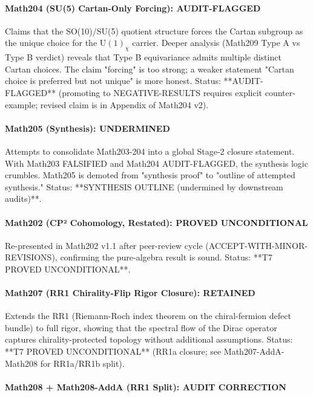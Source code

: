 \paragraph{Math204 (SU(5) Cartan-Only Forcing): AUDIT-FLAGGED}

Claims that the SO(10)/SU(5) quotient structure forces the Cartan subgroup as
the unique choice for the $\mathrm{U}(1)_\chi$ carrier. Deeper analysis (Math209 Type A vs Type B
verdict) reveals that Type B equivariance admits multiple distinct Cartan choices.
The claim "forcing" is too strong; a weaker statement "Cartan choice is preferred
but not unique" is more honest. Status: **AUDIT-FLAGGED** (promoting to NEGATIVE-RESULTS
requires explicit counter-example; revised claim is in Appendix of Math204 v2).

\paragraph{Math205 (Synthesis): UNDERMINED}

Attempts to consolidate Math203-204 into a global Stage-2 closure statement. With
Math203 FALSIFIED and Math204 AUDIT-FLAGGED, the synthesis logic crumbles.
Math205 is demoted from "synthesis proof" to "outline of attempted synthesis."
Status: **SYNTHESIS OUTLINE (undermined by downstream audits)**.

\paragraph{Math202 (CP² Cohomology, Restated): PROVED UNCONDITIONAL}

Re-presented in Math202 v1.1 after peer-review cycle (ACCEPT-WITH-MINOR-REVISIONS),
confirming the pure-algebra result is sound. Status: **T7 PROVED UNCONDITIONAL**.

\paragraph{Math207 (RR1 Chirality-Flip Rigor Closure): RETAINED}

Extends the RR1 (Riemann-Roch index theorem on the chiral-fermion defect bundle)
to full rigor, showing that the spectral flow of the Dirac operator captures
chirality-protected topology without additional assumptions. Status: **T7 PROVED
UNCONDITIONAL** (RR1a closure; see Math207-AddA-Math208 for RR1a/RR1b split).

\paragraph{Math208 + Math208-AddA (RR1 Split): AUDIT CORRECTION}

